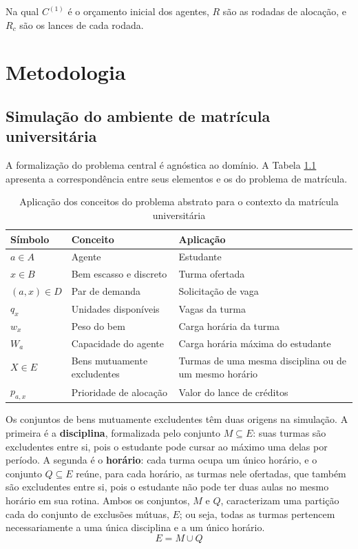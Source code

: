 \documentclass[
    12pt,
    openany,
    oneside,
    a4paper,
    english,
    brazil
]{abntex2}
\begin{document}
Na qual $C^{(1)}$ é o orçamento inicial dos agentes, $R$ são as rodadas de alocação, e $R_c$ são os lances de cada rodada.


\chapter{Metodologia}
\label{cap:metodologia}

\section{Simulação do ambiente de matrícula universitária}
\label{sec:instanciacao}

A formalização do problema central é agnóstica ao domínio. A Tabela \ref{tab:instanciacao} apresenta a correspondência entre seus elementos e os do problema de matrícula.

\begin{table}[H]
\centering
\caption{Aplicação dos conceitos do problema abstrato para o contexto da matrícula universitária}
\label{tab:instanciacao}
\begin{tabularx}{\textwidth}{lXX}
\toprule
\textbf{Símbolo} & \textbf{Conceito} & \textbf{Aplicação} \\
\midrule
$a \in A$        & Agente                        & Estudante \\
$x \in B$        & Bem escasso e discreto        & Turma ofertada \\
$(a,x) \in D$    & Par de demanda                & Solicitação de vaga \\
$q_x$            & Unidades disponíveis          & Vagas da turma \\
$w_x$            & Peso do bem                   & Carga horária da turma \\
$W_a$            & Capacidade do agente          & Carga horária máxima do estudante \\
$X \in E$        & Bens mutuamente excludentes & Turmas de uma mesma disciplina ou de um mesmo horário \\
$p_{a,x}$        & Prioridade de alocação         & Valor do lance de créditos \\
\bottomrule
\end{tabularx}
\end{table}

Os conjuntos de bens mutuamente excludentes têm duas origens na simulação. A primeira é a \textbf{disciplina}, formalizada pelo conjunto $M \subseteq E$: suas turmas são excludentes entre si, pois o estudante pode cursar ao máximo uma delas por período. A segunda é o \textbf{horário}: cada turma ocupa um único horário, e o conjunto $Q \subseteq E$ reúne, para cada horário, as turmas nele ofertadas, que também são excludentes entre si, pois o estudante não pode ter duas aulas no mesmo horário em sua rotina. Ambos os conjuntos, $M$ e $Q$, caracterizam uma partição cada do conjunto de exclusões mútuas, $E$; ou seja, todas as turmas pertencem necessariamente a uma única disciplina e a um único horário.
\begin{equation}
    E = M \cup Q
\end{equation}
\end{document}
